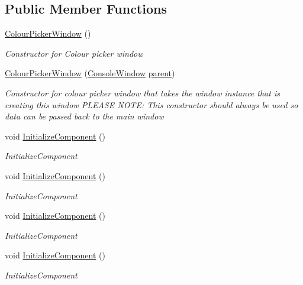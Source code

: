 \subsection*{Public Member Functions}
\begin{DoxyCompactItemize}
\item 
\hyperlink{class_c_p_u___o_s___simulator_1_1_colour_picker_window_afd196933703b7ee4bcac6cbfde73e65f}{Colour\+Picker\+Window} ()
\begin{DoxyCompactList}\small\item\em Constructor for Colour picker window \end{DoxyCompactList}\item 
\hyperlink{class_c_p_u___o_s___simulator_1_1_colour_picker_window_a6d0c7265a93ca643ad296a8664489508}{Colour\+Picker\+Window} (\hyperlink{class_c_p_u___o_s___simulator_1_1_console_window}{Console\+Window} \hyperlink{class_c_p_u___o_s___simulator_1_1_colour_picker_window_a0a40b478316b3e45a63c67347ff9fc63}{parent})
\begin{DoxyCompactList}\small\item\em Constructor for colour picker window that takes the window instance that is creating this window P\+L\+E\+A\+S\+E N\+O\+T\+E\+: This constructor should always be used so data can be passed back to the main window \end{DoxyCompactList}\item 
void \hyperlink{class_c_p_u___o_s___simulator_1_1_colour_picker_window_a83c3f68e51fd577446e25cfb2a8d05ed}{Initialize\+Component} ()
\begin{DoxyCompactList}\small\item\em Initialize\+Component \end{DoxyCompactList}\item 
void \hyperlink{class_c_p_u___o_s___simulator_1_1_colour_picker_window_a83c3f68e51fd577446e25cfb2a8d05ed}{Initialize\+Component} ()
\begin{DoxyCompactList}\small\item\em Initialize\+Component \end{DoxyCompactList}\item 
void \hyperlink{class_c_p_u___o_s___simulator_1_1_colour_picker_window_a83c3f68e51fd577446e25cfb2a8d05ed}{Initialize\+Component} ()
\begin{DoxyCompactList}\small\item\em Initialize\+Component \end{DoxyCompactList}\item 
void \hyperlink{class_c_p_u___o_s___simulator_1_1_colour_picker_window_a83c3f68e51fd577446e25cfb2a8d05ed}{Initialize\+Component} ()
\begin{DoxyCompactList}\small\item\em Initialize\+Component \end{DoxyCompactList}\end{DoxyCompactItemize}
